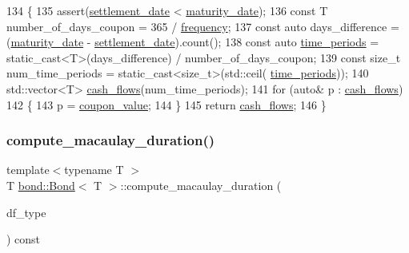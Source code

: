 \begin{DoxyCode}
134     \{
135         assert(\hyperlink{classbond_1_1_bond_a2ead15c4c0cbda2cdecf6500b02442e7}{settlement\_date} < \hyperlink{classbond_1_1_bond_aba0bd9e2e1de7b9f05bb9c61b1fb9f1e}{maturity\_date});
136         \textcolor{keyword}{const} T number\_of\_days\_coupon = 365 / \hyperlink{classbond_1_1_bond_ad1871f40122a63fb0b2ebbdcdd12c1cd}{frequency};
137         \textcolor{keyword}{const} \textcolor{keyword}{auto} days\_difference = (\hyperlink{classbond_1_1_bond_aba0bd9e2e1de7b9f05bb9c61b1fb9f1e}{maturity\_date} - 
      \hyperlink{classbond_1_1_bond_a2ead15c4c0cbda2cdecf6500b02442e7}{settlement\_date}).count();
138         \textcolor{keyword}{const} \textcolor{keyword}{auto} \hyperlink{classbond_1_1_bond_ac3db034ebeff1f6cd2ed7061fda27fad}{time\_periods} = \textcolor{keyword}{static\_cast<}T\textcolor{keyword}{>}(days\_difference) / number\_of\_days\_coupon;
139         \textcolor{keyword}{const} \textcolor{keywordtype}{size\_t} num\_time\_periods = \textcolor{keyword}{static\_cast<}\textcolor{keywordtype}{size\_t}\textcolor{keyword}{>}(std::ceil(
      \hyperlink{classbond_1_1_bond_ac3db034ebeff1f6cd2ed7061fda27fad}{time\_periods}));
140         std::vector<T> \hyperlink{classbond_1_1_bond_ae98011d18cd97942b45f5868a42bf668}{cash\_flows}(num\_time\_periods);
141         \textcolor{keywordflow}{for} (\textcolor{keyword}{auto}& p : \hyperlink{classbond_1_1_bond_ae98011d18cd97942b45f5868a42bf668}{cash\_flows})
142         \{
143             p = \hyperlink{classbond_1_1_bond_aae68bdfac23a0530b3723cca3100e92e}{coupon\_value};
144         \}
145         \textcolor{keywordflow}{return} \hyperlink{classbond_1_1_bond_ae98011d18cd97942b45f5868a42bf668}{cash\_flows};
146     \}
\end{DoxyCode}
\mbox{\label{classbond_1_1_bond_a57f98f3e281876089945e08457ce6bc6}} 
\subsubsection{\texorpdfstring{compute\+\_\+macaulay\+\_\+duration()}{compute\_macaulay\_duration()}}
{\footnotesize\ttfamily template$<$typename T $>$ \\
T \hyperlink{classbond_1_1_bond}{bond\+::\+Bond}$<$ T $>$\+::compute\+\_\+macaulay\+\_\+duration (\begin{DoxyParamCaption}\item[{const \hyperlink{namespaceutilities_ad4290e607d0651ce53db6e5c776aca7c}{D\+F\+\_\+type} \&}]{df\+\_\+type }\end{DoxyParamCaption}) const}



